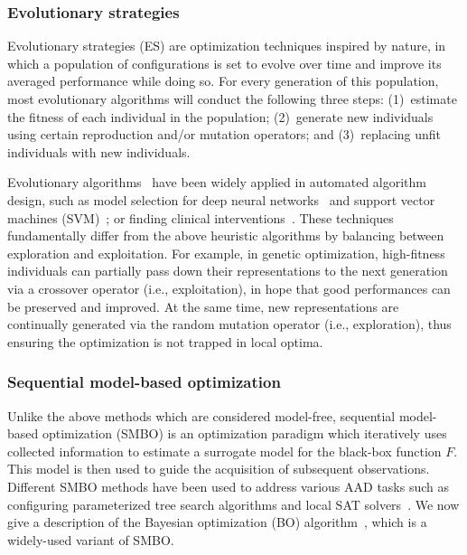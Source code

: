 \subsubsection{Evolutionary strategies}
Evolutionary strategies (ES) are optimization techniques inspired by nature, in which a population of configurations is set to evolve over time and improve its averaged performance while doing so. For every generation of this population, most evolutionary algorithms will conduct the following three steps: (1)~estimate the fitness of each individual in the population; (2)~generate new individuals using certain reproduction and/or mutation operators; and (3)~replacing unfit individuals with new individuals. 

Evolutionary algorithms~\cite{fogel1994introduction,banzhaf1998genetic} have been widely applied in automated algorithm design, such as model selection for deep neural networks~\cite{olson2016tpot,lorenzo2017particle,miikkulainen2019evolving,liang2019evolutionary} and support vector machines (SVM)~\cite{lin2008particle}; or finding clinical interventions~\cite{miikkulainen2021prediction}. These techniques fundamentally differ from the above heuristic algorithms by balancing between exploration and exploitation. For example, in genetic optimization, high-fitness individuals can partially pass down their representations to the next generation via a crossover operator (i.e., exploitation), in hope that good performances can be preserved and improved. At the same time, new representations are continually generated via the random mutation operator (i.e., exploration), thus ensuring the optimization is not trapped in local optima.

\subsubsection{Sequential model-based optimization}
Unlike the above methods which are considered model-free, sequential model-based optimization (SMBO) is an optimization paradigm which iteratively uses collected information to estimate a surrogate model for the black-box function $F$. This model is then used to guide the acquisition of subsequent observations. Different SMBO methods have been used to address various AAD tasks such as configuring parameterized tree search algorithms and local SAT solvers~\cite{hutter2011sequential}. We now give a description of the Bayesian optimization (BO) algorithm~\cite{Snoek12}, which is a widely-used variant of SMBO.

